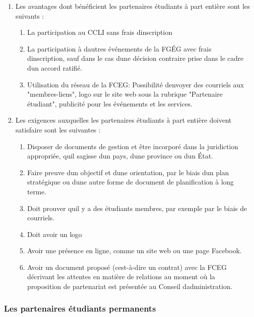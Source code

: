 \begin{enumerate}
 \item
  Les avantages dont bénéficient les partenaires étudiants à part entière sont les suivants :

  \begin{enumerate}
   \item
    La participation au CCLI sans frais d\textquotesingle inscription
   \item
    La participation à d\textquotesingle autres événements de la FGÉG avec frais d\textquotesingle inscription, sauf dans le cas d\textquotesingle une décision contraire prise dans le cadre d\textquotesingle un accord ratifié.
   \item
    Utilisation du réseau de la FCEG: Possibilité d\textquotesingle envoyer des courriels aux "membres-liens", logo sur le site web sous la rubrique "Partenaire étudiant", publicité pour les événements et les services.
  \end{enumerate}
 \item
  Les exigences auxquelles les partenaires étudiants à part entière doivent satisfaire sont les suivantes :

  \begin{enumerate}
   \item
    Disposer de documents de gestion et être incorporé dans la juridiction appropriée, qu\textquotesingle il s\textquotesingle agisse d\textquotesingle un pays, d\textquotesingle une province ou d\textquotesingle un État.
   \item
    Faire preuve d\textquotesingle un objectif et d\textquotesingle une orientation, par le biais d\textquotesingle un plan stratégique ou d\textquotesingle une autre forme de document de planification à long terme.
   \item
    Doit prouver qu\textquotesingle il y a des étudiants membres, par exemple par le biais de courriels.
   \item
    Doit avoir un logo
   \item
    Avoir une présence en ligne, comme un site web ou une page Facebook.
   \item
    Avoir un document proposé (c\textquotesingle est-à-dire un contrat) avec la FCEG décrivant les attentes en matière de relations au moment où la proposition de partenariat est présentée au Conseil d\textquotesingle administration.
  \end{enumerate}
\end{enumerate}

\subsubsection{Les partenaires étudiants permanents}
\label{les-partenaires-etudiants-permanents}

